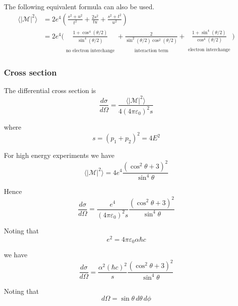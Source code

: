 The following equivalent formula can also be used.
\begin{align*}
\langle|\mathcal{M}|^2\rangle
&=2e^4
\left(
\frac{s^2+u^2}{t^2}+\frac{2s^2}{tu}+\frac{s^2+t^2}{u^2}
\right)
\\
&=2e^4\biggl(
\underset{\substack{\\[1ex]\text{no electron interchange}}}
{\frac{1+\cos^4(\theta/2)}{\sin^4(\theta/2)}}
+
\underset{\substack{\\[1ex]\text{interaction term}}}
{\frac{2}{\sin^2(\theta/2)\cos^2(\theta/2)}}
+
\underset{\substack{\\[1ex]\text{electron interchange}}}
{\frac{1+\sin^4(\theta/2)}{\cos^4(\theta/2)}}
\biggr)
\end{align*}
\fi

\subsubsection*{Cross section}

The differential cross section is
\begin{equation*}
\frac{d\sigma}{d\Omega}=\frac{\langle|\mathcal{M}|^2\rangle}{4(4\pi\varepsilon_0)^2s}
\end{equation*}

where
\begin{equation*}
s=(p_1+p_2)^2=4E^2
\end{equation*}

For high energy experiments we have
\begin{equation*}
\langle|\mathcal{M}|^2\rangle=4e^4\frac{(\cos^2\theta+3)^2}{\sin^4\theta}
\end{equation*}

Hence
\begin{equation*}
\frac{d\sigma}{d\Omega}=\frac{e^4}{(4\pi\varepsilon_0)^2s}\frac{(\cos^2\theta+3)^2}{\sin^4\theta}
\end{equation*}

Noting that
\begin{equation*}
e^2=4\pi\varepsilon_0\alpha\hbar c
\end{equation*}

we have
\begin{equation*}
\frac{d\sigma}{d\Omega}=\frac{\alpha^2(\hbar c)^2}{s}
\frac{(\cos^2\theta+3)^2}{\sin^4\theta}
\end{equation*}

Noting that
\begin{equation*}
d\Omega=\sin\theta\,d\theta\,d\phi
\end{equation*}

